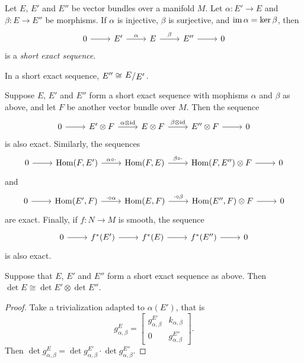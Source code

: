 \begin{definicija}
Let $E$, $E'$ and $E''$ be vector bundles over a manifold $M$. Let
$\alpha \colon E' \to E$ and $\beta \colon E \to E''$ be morphisms.
If $\alpha$ is injective, $\beta$ is surjective, and
$\operatorname{im} \alpha = \ker \beta$, then
\[
\begin{tikzcd}
0 \arrow[r] &
E' \arrow[r, "\alpha"] &
E \arrow[r, "\beta"] &
E'' \arrow[r] &
0
\end{tikzcd}
\]
is a \emph{short exact sequence}.
\end{definicija}

\begin{opomba}
In a short exact sequence, $E'' \cong \kvoc{E}{E'}$.
\end{opomba}

\begin{trditev}
Suppose $E$, $E'$ and $E''$ form a short exact sequence with
mophisms $\alpha$ and $\beta$ as above, and let $F$ be another
vector bundle over $M$. Then the sequence
\[
\begin{tikzcd}
0 \arrow[r] &
E' \otimes F \arrow[r, "\alpha \otimes \id"] &
E \otimes F \arrow[r, "\beta \otimes \id"] &
E'' \otimes F \arrow[r] &
0
\end{tikzcd}
\]
is also exact. Similarly, the sequences
\[
\begin{tikzcd}
0 \arrow[r] &
\Hom(F, E') \arrow[r, "\alpha \circ \cdot"] &
\Hom(F, E) \arrow[r, "\beta \circ \cdot"] &
\Hom(F, E'') \otimes F \arrow[r] &
0
\end{tikzcd}
\]
and
\[
\begin{tikzcd}
0 \arrow[r] &
\Hom(E', F) \arrow[r, "\cdot \circ \alpha"] &
\Hom(E, F) \arrow[r, "\cdot \circ \beta"] &
\Hom(E'', F) \otimes F \arrow[r] &
0
\end{tikzcd}
\]
are exact. Finally, if $f \colon N \to M$ is smooth, the sequence
\[
\begin{tikzcd}
0 \arrow[r] &
f^*(E') \arrow[r] &
f^*(E) \arrow[r] &
f^*(E'') \arrow[r] &
0
\end{tikzcd}
\]
is also exact.
\end{trditev}

\begin{izrek}
Suppose that $E$, $E'$ and $E''$ form a short exact sequence as
above. Then $\det E \cong \det E' \otimes \det E''$.
\end{izrek}

\begin{proof}
Take a trivialization adapted to $\alpha(E')$, that is
\[
g_{\alpha, \beta}^E =
\begin{bmatrix}
g_{\alpha, \beta}^{E'} & k_{\alpha, \beta}       \\
         0             & g_{\alpha, \beta}^{E''}
\end{bmatrix}.
\]
Then
$\det g_{\alpha, \beta}^E =
\det g_{\alpha, \beta}^{E'} \cdot \det g_{\alpha, \beta}^{E''}$.
\end{proof}

